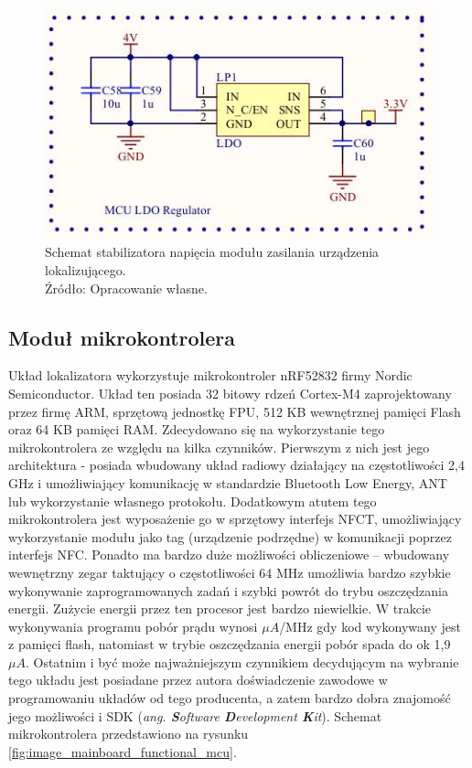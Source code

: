 \begin{figure}[H]
	\centering
	\includegraphics[width=12cm]{img/schematics/mainboard_power_ldo.jpg}
	\caption{Schemat stabilizatora napięcia modułu zasilania urządzenia lokalizującego. \\ Źródło: Opracowanie własne.}
	\label{fig:image_mainboard_power_ldo}
\end{figure}

\subsection{Moduł mikrokontrolera}

Układ lokalizatora wykorzystuje mikrokontroler nRF52832 firmy Nordic Semiconductor. Układ ten posiada 32 bitowy rdzeń Cortex-M4 zaprojektowany przez firmę ARM, sprzętową jednostkę FPU, 512 KB wewnętrznej pamięci Flash oraz 64 KB pamięci RAM. Zdecydowano się na wykorzystanie tego mikrokontrolera ze względu na kilka czynników. Pierwszym z nich jest jego architektura - posiada wbudowany układ radiowy działający na częstotliwości 2,4 GHz i umożliwiający komunikację w standardzie Bluetooth Low Energy, ANT lub wykorzystanie własnego protokołu. Dodatkowym atutem tego mikrokontrolera jest wyposażenie go w sprzętowy interfejs NFCT, umożliwiający wykorzystanie modułu jako tag (urządzenie podrzędne) w komunikacji poprzez interfejs NFC. Ponadto ma bardzo duże możliwości obliczeniowe – wbudowany wewnętrzny zegar taktujący o częstotliwości 64 MHz umożliwia bardzo szybkie wykonywanie zaprogramowanych zadań i szybki powrót do trybu oszczędzania energii. Zużycie energii przez ten procesor jest bardzo niewielkie. W trakcie wykonywania programu pobór prądu wynosi  $\mu A$/MHz gdy kod wykonywany jest z pamięci flash, natomiast w trybie oszczędzania energii pobór spada do ok 1,9 $\mu A$. Ostatnim i być może najważniejszym czynnikiem decydującym na wybranie tego układu jest posiadane przez autora doświadczenie zawodowe w programowaniu układów od tego producenta, a zatem bardzo dobra znajomość jego możliwości i \linebreak SDK (\textit{ang. \textbf{S}oftware \textbf{D}evelopment \textbf{K}it}). Schemat mikrokontrolera przedstawiono na rysunku \ref{fig:image_mainboard_functional_mcu}.

